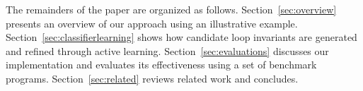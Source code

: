 
The remainders of the paper are organized as follows.
Section~\ref{sec:overview} presents an overview of our approach using an illustrative example.
Section~\ref{sec:classifierlearning} shows how candidate loop invariants are generated and refined through active learning.
Section~\ref{sec:evaluations} discusses our implementation and evaluates its effectiveness using a set of benchmark programs.
Section~\ref{sec:related} reviews related work and concludes.

